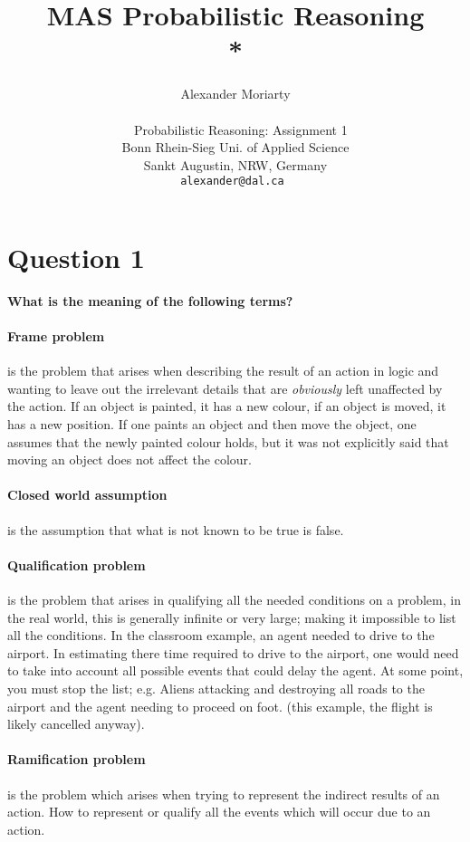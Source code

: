 \documentclass[a4paper, 12 pt, conference, onecolumn]{IEEEconf}
\title{\LARGE \bf
MAS Probabilistic Reasoning\\* 
}
\author{Alexander Moriarty\\~\\~
        Probabilistic Reasoning: Assignment 1\\
        Bonn Rhein-Sieg Uni. of Applied Science\\ 
        Sankt Augustin, NRW, Germany\\
        \tt\small alexander@dal.ca
}
\begin{document}
\maketitle

\section{Question 1}
\textbf{What is the meaning of the following terms?}

\paragraph{Frame problem}
is the problem that arises when describing the result of an action in logic and wanting to leave out the irrelevant details that are \emph{obviously} left unaffected by the action. If an object is painted, it has a new colour, if an object is moved, it has a new position. If one paints an object and then move the object, one assumes that the newly painted colour holds, but it was not explicitly said that moving an object does not affect the colour.

\paragraph{Closed world assumption}
is the assumption that what is not known to be true is false.

\paragraph{Qualification problem}
is the problem that arises in qualifying all the needed conditions on a problem, in the real world, this is generally infinite or very large; making it impossible to list all the conditions.
In the classroom example, an agent needed to drive to the airport. In estimating there time required to drive to the airport, one would need to take into account all possible events that could delay the agent. At some point, you must stop the list; e.g. Aliens attacking and destroying all roads to the airport and the agent needing to proceed on foot. (this example, the flight is likely cancelled anyway).

\paragraph{Ramification problem}
is the problem which arises when trying to represent the indirect results of an action. How to represent or qualify all the events which will occur due to an action.
\end{document}
